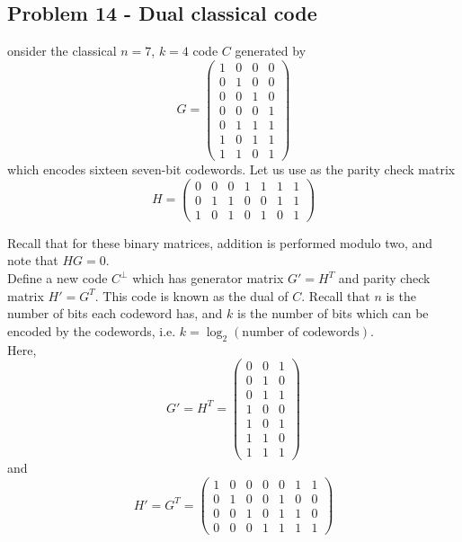 \subsection{Problem 14 - Dual classical code}
onsider the classical $n=7$, $k=4$ code $C$ generated by
\begin{equation}
G=
\begin{pmatrix}
1 & 0 & 0 & 0\\
0 & 1 & 0 & 0\\
0 & 0 & 1 & 0\\
0 & 0 & 0 & 1\\
0 & 1 & 1 & 1\\
1 & 0 & 1 & 1\\
1 & 1 & 0 & 1
\end{pmatrix}
\end{equation}
which encodes sixteen seven-bit codewords. Let us use as the parity check matrix
\begin{equation}
H=
\begin{pmatrix}
0 & 0 & 0 & 1 & 1 & 1 & 1\\
0 & 1 & 1 & 0 & 0 & 1 & 1\\
1 & 0 & 1 & 0 & 1 & 0 & 1
\end{pmatrix}
\end{equation}

Recall that for these binary matrices, addition is performed modulo two, and note that $HG=0$.\\

Define a new code $C^\perp$ which has generator matrix $G' = H^T$ and parity check matrix $H'= G^T$. This code is known as the dual of $C$. Recall that $n$ is the number of bits each codeword has, and $k$ is the number of bits which can be encoded by the codewords, i.e. $k = \log_2(\text{number of codewords}) $. \\

Here,
\begin{equation}
    G' = H^T = \begin{pmatrix}
        0 & 0 & 1 \\ 
        0 & 1 & 0 \\
        0 & 1 & 1 \\ 
        1 & 0 & 0 \\
        1 & 0 & 1 \\
        1 & 1 & 0 \\
        1 & 1 & 1 
    \end{pmatrix}
\end{equation}
and 
\begin{equation}
    H' = G^T = \begin{pmatrix}
        1 & 0 & 0 & 0 & 0 & 1 & 1 \\
        0 & 1 & 0 & 0 & 1 & 0 & 0 \\
        0 & 0 & 1 & 0 & 1 & 1 & 0 \\
        0 & 0 & 0 & 1 & 1 & 1 & 1
    \end{pmatrix}
\end{equation}

